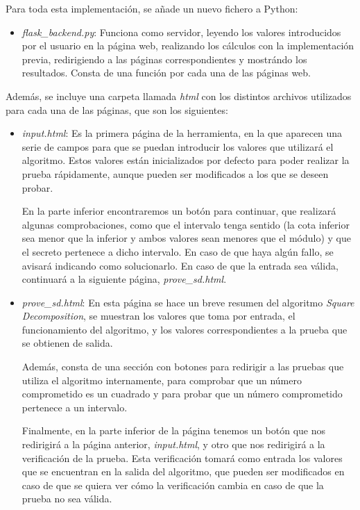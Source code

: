 Para toda esta implementación, se añade un nuevo fichero a Python:
\begin{itemize}
    \item \emph{flask\_backend.py}: Funciona como servidor, leyendo los valores introducidos por el usuario en la página web, realizando los cálculos con la implementación previa, redirigiendo a las páginas correspondientes y mostrándo los resultados. Consta de una función por cada una de las páginas web.
\end{itemize}

Además, se incluye una carpeta llamada \emph{html} con los distintos archivos utilizados para cada una de las páginas, que son los siguientes:
\begin{itemize}
    \item \emph{input.html}: Es la primera página de la herramienta, en la que aparecen una serie de campos para que se puedan introducir los valores que utilizará el algoritmo. Estos valores están inicializados por defecto para poder realizar la prueba rápidamente, aunque pueden ser modificados a los que se deseen probar.
    
    En la parte inferior encontraremos un botón para continuar, que realizará algunas comprobaciones, como que el intervalo tenga sentido (la cota inferior sea menor que la inferior y ambos valores sean menores que el módulo) y que el secreto pertenece a dicho intervalo. En caso de que haya algún fallo, se avisará indicando como solucionarlo. En caso de que la entrada sea válida, continuará a la siguiente página, \emph{prove\_sd.html}.

    \item \emph{prove\_sd.html}: En esta página se hace un breve resumen del algoritmo \emph{Square Decomposition}, se muestran los valores que toma por entrada, el funcionamiento del algoritmo, y los valores correspondientes a la prueba que se obtienen de salida.

    Además, consta de una sección con botones para redirigir a las pruebas que utiliza el algoritmo internamente, para comprobar que un número comprometido es un cuadrado y para probar que un número comprometido pertenece a un intervalo.

    Finalmente, en la parte inferior de la página tenemos un botón que nos redirigirá a la página anterior, \emph{input.html}, y otro que nos redirigirá a la verificación de la prueba. Esta verificación tomará como entrada los valores que se encuentran en la salida del algoritmo, que pueden ser modificados en caso de que se quiera ver cómo la verificación cambia en caso de que la prueba no sea válida.


\end{itemize}
